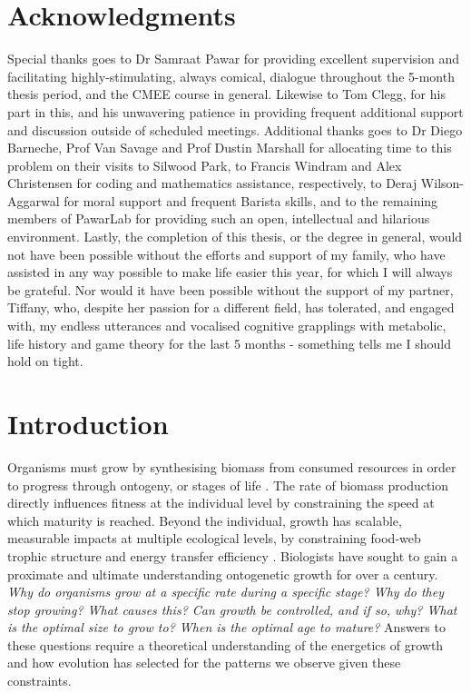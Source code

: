 \documentclass[a4paper]{article} %
\begin{document}
\section*{Acknowledgments}\thispagestyle{plain}
    Special thanks goes to Dr Samraat Pawar for providing excellent supervision and facilitating  highly-stimulating, always comical, dialogue throughout the 5-month thesis period, and the CMEE course in general. Likewise to Tom Clegg, for his part in this, and his unwavering patience in providing frequent additional support and discussion outside of scheduled meetings. Additional thanks goes to Dr Diego Barneche, Prof Van Savage and Prof Dustin Marshall for allocating time to this problem on their visits to Silwood Park, to Francis Windram and Alex Christensen for coding and mathematics assistance, respectively, to Deraj Wilson-Aggarwal for moral support and frequent Barista skills, and to the remaining members of PawarLab for providing such an open, intellectual and hilarious environment. Lastly, the completion of this thesis, or the degree in general, would not have been possible without the efforts and support of my family, who have assisted in any way possible to make life easier this year, for which I will always be grateful. Nor would it have been possible without the support of my partner, Tiffany, who, despite her passion for a different field, has tolerated, and engaged with, my endless utterances and vocalised cognitive grapplings with metabolic, life history and game theory for the last 5 months - something tells me I should hold on tight.

\newpage\tableofcontents\thispagestyle{plain}

\newpage\listoffigures\thispagestyle{plain}


\newpage

\section{Introduction}\thispagestyle{plain}
\linenumbers
    Organisms must grow by synthesising biomass from consumed resources in order to progress through ontogeny, or stages of life \autocite{Hariharan2016}. The rate of biomass production directly influences fitness at the individual level by constraining the speed at which maturity is reached. Beyond the individual, growth has scalable, measurable impacts at multiple ecological levels, by constraining food-web trophic structure and energy transfer efficiency \autocite{Barneche2018}. Biologists have sought to gain a proximate and ultimate understanding ontogenetic growth for over a century. \textit{Why do organisms grow at a specific rate during a specific stage? Why do they stop growing? What causes this? Can growth be controlled, and if so, why? What is the optimal size to grow to? When is the optimal age to mature?} Answers to these questions require a theoretical understanding of the energetics of growth and how evolution has selected for the patterns we observe given these constraints. 
    
\end{document}

